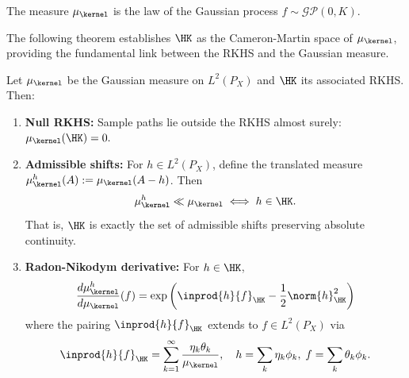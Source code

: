 \documentclass{article}
\begin{document}
\begin{remark}
	The measure $\mu_\kernel$ is the law of the Gaussian process $f \sim \mathcal{GP}(0, K)$.
\end{remark}


The following theorem establishes $\HK$ as the Cameron-Martin space of $\mu_\kernel$, providing the fundamental link between the RKHS and the Gaussian measure.

\begin{theorem}
	\label{thm:cameron-martin}
	Let $\mu_\kernel$ be the Gaussian measure on $L^2(P_X)$ and $\HK$ its associated RKHS. Then:

	\begin{enumerate}[label=(\roman*)]
		\item \textbf{Null RKHS:} Sample paths lie outside the RKHS almost surely:
		      $
			      \mu_\kernel(\HK) = 0.
		      $

		\item \textbf{Admissible shifts:} For $h \in L^2(P_X)$, define the translated measure $\mu_\kernel^h(A) := \mu_\kernel(A - h)$. Then
		      \begin{equation}
			      \mu_\kernel^h \ll \mu_\kernel \iff h \in \HK.
		      \end{equation}
		      That is, $\HK$ is exactly the set of admissible shifts preserving absolute continuity.

		\item \textbf{Radon-Nikodym derivative:} For $h \in \HK$,
		      \begin{equation}
			      \frac{d\mu_\kernel^h}{d\mu_\kernel}(f) = \exp\left( \inprod{h}{f}_{\HK} - \frac{1}{2}\norm{h}_{\HK}^2 \right)
		      \end{equation}
		      where the pairing $\inprod{h}{f}_{\HK}$ extends to $f \in L^2(P_X)$ via
		      \begin{equation}
			      \inprod{h}{f}_{\HK} = \sum_{k=1}^\infty \frac{\eta_k \theta_k}{\mu_\kernel}, \quad h = \sum_k \eta_k \phi_k, \; f = \sum_k \theta_k \phi_k.
		      \end{equation}
	\end{enumerate}
\end{theorem}
\end{document}

